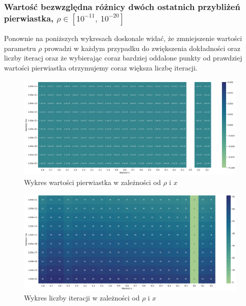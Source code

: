 \documentclass{article}
\begin{document}
\subsubsection{Wartość bezwzględna różnicy dwóch ostatnich przybliżeń pierwiastka, \(\rho \in [10^{-11}, \ 10^{-20}]\)}

Ponownie na poniższych wykresach doskonale widać, że zmniejszenie wartości parametru \(\rho\) prowadzi w każdym przypadku do zwiększenia dokładności oraz liczby iteracj oraz że wybierając coraz bardziej oddalone punkty od prawdziej wartości pierwiastka otrzymujemy coraz większa liczbę iteracji. 


\begin{figure}[H]
  \centering
  \begin{minipage}[b]{\textwidth}
    \includegraphics[width=\textwidth]{heatmap07.png}
  \end{minipage}
  \caption{Wykres wartości pierwiastka w zależności od \(\rho\) i \(x\)}
\end{figure}

\begin{figure}[H]
  \centering
  \begin{minipage}[b]{\textwidth}
    \includegraphics[width=\textwidth]{heatmap08.png}
  \end{minipage}
  \caption{Wykres liczby iteracji w zależności od \(\rho\) i \(x\)}
\end{figure}
\end{document}
